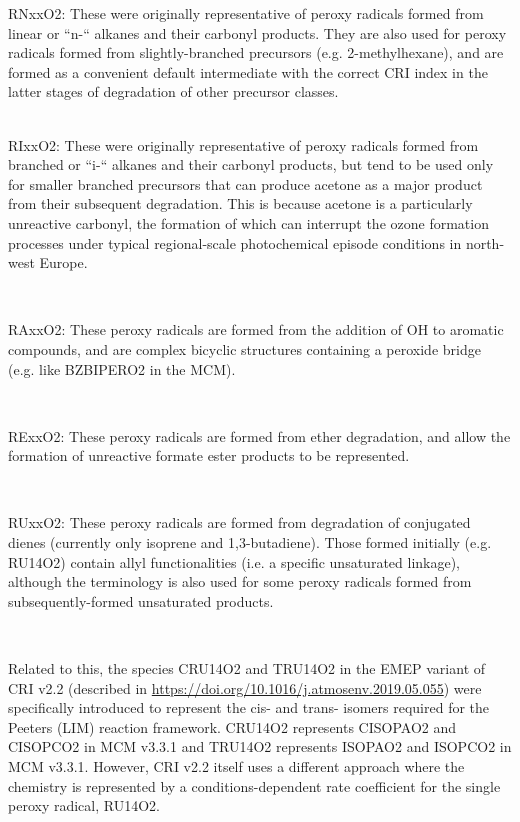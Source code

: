 {{RNxxO2: These were originally representative of peroxy radicals formed from linear or “n-“ alkanes and their carbonyl products. They are also used for peroxy radicals formed from slightly-branched precursors (e.g. 2-methylhexane), and are formed as a convenient default intermediate with the correct CRI index in the latter stages of degradation of other precursor classes.
\\}\\ \parbox{\textwidth}{
RIxxO2: These were originally representative of peroxy radicals formed from branched or “i-“ alkanes and their carbonyl products, but tend to be used only for smaller branched precursors that can produce acetone as a major product from their subsequent degradation. This is because acetone is a particularly unreactive carbonyl, the formation of which can interrupt the ozone formation processes under typical regional-scale photochemical episode conditions in north-west Europe.
\\}\\ \parbox{\textwidth}{
RAxxO2: These peroxy radicals are formed from the addition of OH to aromatic compounds, and are complex bicyclic structures containing a peroxide bridge (e.g. like BZBIPERO2 in the MCM).
\\}\\ \parbox{\textwidth}{
RExxO2: These peroxy radicals are formed from ether degradation, and allow the formation of unreactive formate ester products to be represented.
\\}\\ \parbox{\textwidth}{
RUxxO2: These peroxy radicals are formed from degradation of conjugated dienes (currently only isoprene and 1,3-butadiene). Those formed initially (e.g. RU14O2) contain allyl functionalities (i.e. a specific unsaturated linkage), although the terminology is also used for some peroxy radicals formed from subsequently-formed unsaturated products.
\\}\\ \parbox{\textwidth}{
Related to this, the species CRU14O2 and TRU14O2 in the EMEP variant of CRI v2.2 (described in \url{https://doi.org/10.1016/j.atmosenv.2019.05.055}) were specifically introduced to represent the cis- and trans- isomers required for the Peeters (LIM) reaction framework. CRU14O2 represents CISOPAO2 and CISOPCO2 in MCM v3.3.1 and TRU14O2 represents ISOPAO2 and ISOPCO2 in MCM v3.3.1. However, CRI v2.2 itself uses a different approach where the chemistry is represented by a conditions-dependent rate coefficient for the single peroxy radical, RU14O2.
}}
